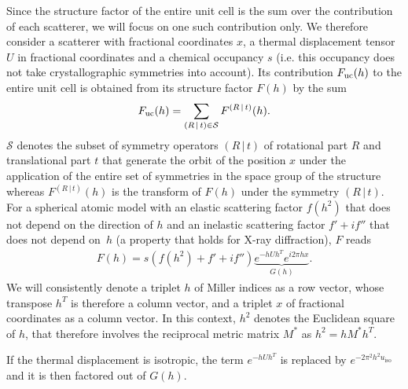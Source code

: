 \documentclass[pdf]{iucr}
\newcommand{\sym}[2]{\left( #1\,\vert\, #2 \right)}
\newcommand{\uiso}{u_{\text{iso}}}
\begin{document}
Since the structure factor of the entire unit cell is the sum over the contribution of each scatterer, we will focus on one such contribution only. We therefore consider a scatterer with  fractional coordinates $x$, a thermal displacement tensor $U$ in fractional coordinates and a chemical occupancy $s$ (i.e. this occupancy does not take crystallographic symmetries into account).  Its contribution $F_{\text{uc}}(h)$ to the entire unit cell is obtained from its  structure factor $F(h)$  by the sum
\begin{align}
\Fuc(h) = \sum_{\sym{R}{t} \in \mathcal{S}} F^{\sym{R}{t}}(h).
\end{align}
$\mathcal{S}$ denotes the subset of symmetry operators $\sym{R}{t}$ of rotational part $R$ and translational part $t$ that generate the orbit of the position $x$ under the application of the entire set of symmetries in the space group of the structure whereas $F^{\sym{R}{t}}(h)$ is the transform of $F(h)$ under the symmetry $\sym{R}{t}$. For a spherical atomic model with an elastic scattering factor $f(h^2)$ that does not depend on the direction of $h$ and an inelastic scattering factor $f' + if''$ that does not depend on~$h$ (a property that holds for X-ray diffraction), $F$ reads
\begin{align}
F(h) = s (f(h^2) + f' + i f'') \underbrace{e^{-h U h^T} e^{i 2\pi h x}}_{G(h)}.
\end{align}
We will consistently denote a triplet $h$ of Miller indices as a row vector, whose transpose $h^T$ is therefore a column vector, and a triplet $x$ of fractional coordinates as a column vector. In this context, $h^2$ denotes the Euclidean square of $h$, that therefore involves the reciprocal metric matrix $M^*$ as $h^2 = h M^* h^T$.

If the thermal displacement is isotropic, the term $e^{-h U h^T}$ is replaced by $e^{-2\pi^2 h^2 \uiso}$ and it is then factored out of $G(h)$.
\end{document}
